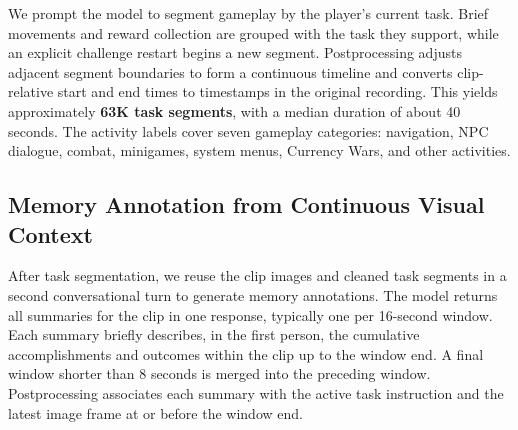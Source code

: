 We prompt the model to segment gameplay by the player's current task. Brief movements and reward collection are grouped with the task they support, while an explicit challenge restart begins a new segment. Postprocessing adjusts adjacent segment boundaries to form a continuous timeline and converts clip-relative start and end times to timestamps in the original recording. This yields approximately \textbf{63K task segments}, with a median duration of about 40 seconds. The activity labels cover seven gameplay categories: navigation, NPC dialogue, combat, minigames, system menus, Currency Wars, and other activities.

\subsection{Memory Annotation from Continuous Visual Context}
\label{sec:data_memory}

After task segmentation, we reuse the clip images and cleaned task segments in a second conversational turn to generate memory annotations. The model returns all summaries for the clip in one response, typically one per 16-second window. Each summary briefly describes, in the first person, the cumulative accomplishments and outcomes within the clip up to the window end. A final window shorter than 8 seconds is merged into the preceding window. Postprocessing associates each summary with the active task instruction and the latest image frame at or before the window end.

